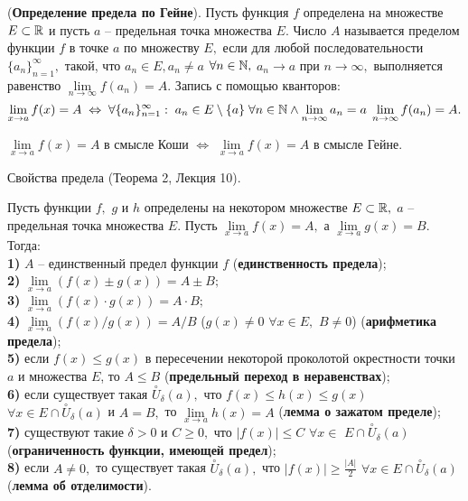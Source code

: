 \begin{definition}
	(\textbf{Определение предела по Гейне}).
	Пусть функция $f$ определена на множестве
	$E\subset\mathbb{R}$ и пусть $a$ -- предельная
	точка множества $E.$ Число $A$ называется
	пределом функции $f$ в точке $a$ по множеству
	$E,$ если для любой последовательности
	$\{a_n\}_{n=1}^{\infty},$ такой, что
	$a_n \in E, a_n\neq a$
	$\forall n \in \mathbb{N},$ $a_n\rightarrow a$
	при $n\rightarrow\infty,$
	выполняется равенство $\lim
		\limits_{n\rightarrow\infty}f(a_n)=A.$
	Запись с помощью кванторов:
	$$
		\lim\limits_{x\rightarrow a}f(x)=A\;\Leftrightarrow\;
		\forall \{a_n\}_{n=1}^{\infty}:\;
		a_n \in E\setminus\{a\}\;\forall n \in \mathbb{N}\wedge
		\lim\limits_{n\rightarrow\infty}a_n=a\;
		\lim\limits_{n\rightarrow\infty}f(a_n)=A.
	$$
\end{definition}

\begin{theorem}
	$\lim\limits_{x\rightarrow a}f(x)=A$ в смысле Коши
	$\Leftrightarrow$
	$\lim\limits_{x\rightarrow a}f(x)=A$ в смысле Гейне.
\end{theorem}

\newpage
\begin{problem}
Свойства предела (Теорема 2, Лекция 10).
\end{problem}

\begin{theorem} Пусть функции $f,$ $g$ и $h$
	определены на некотором множестве $E\subset\mathbb{R},$
	$a$ -- предельная точка множества $E.$
	Пусть $\lim\limits_{x\rightarrow a}f(x)=A,$ а
	$\lim\limits_{x\rightarrow a}g(x)=B$. Тогда:\\
	\textbf{1)} $A$ -- единственный предел функции $f$
	(\textbf{единственность предела});\\
	\textbf{2)} $\lim\limits_{x\rightarrow a}(f(x)\pm g(x))=A\pm B;$\\
	\textbf{3)} $\lim\limits_{x\rightarrow a}(f(x)\cdot g(x))=A\cdot B;$\\
	\textbf{4)} $\lim\limits_{x\rightarrow a}(f(x)/g(x))=A/B$
	($g(x)\neq0$ $\forall x \in E,$ $B\neq0$)
	(\textbf{арифметика предела});\\
	\textbf{5)} если $f(x)\leq g(x)$ в пересечении некоторой
	проколотой окрестности точки $a$ и множества $E$, то $A\leq B$
	(\textbf{предельный переход в неравенствах});\\
	\textbf{6)} если существует такая
	$\stackrel{\circ}{U}_{\delta}(a),$ что
	$f(x)\leq h(x)\leq g(x)$ $\forall
		x\in E\cap\stackrel{\circ}{U}_{\delta}(a)$
	и $A=B,$ то
	$\lim\limits_{x\rightarrow a}h(x)=A$
	(\textbf{лемма о зажатом пределе});\\
	\textbf{7)} существуют такие $\delta>0$
	и $C\geq0,$ что
	$|f(x)|\leq C$ $\forall x\in$
	$E\cap\stackrel{\circ}{U}_{\delta}(a)$
	(\textbf{ограниченность функции, имеющей предел});\\
	\textbf{8)} если $A\neq0,$ то существует такая
	$\stackrel{\circ}{U}_{\delta}(a),$ что
	$|f(x)|\geq\frac{|A|}{2}$ $\forall x\in
		E\cap\stackrel{\circ}{U}_{\delta}(a)$
	(\textbf{лемма об отделимости}).
\end{theorem}

